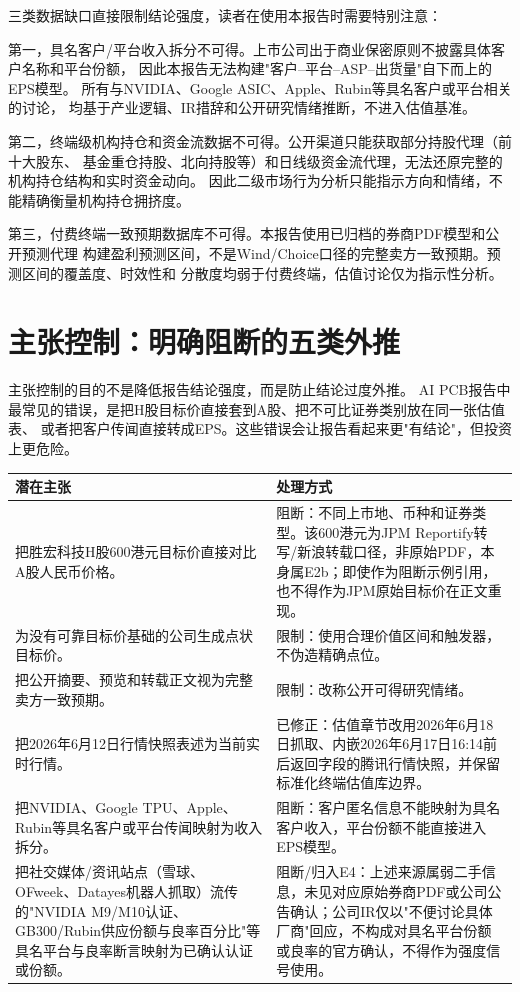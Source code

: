 三类数据缺口直接限制结论强度，读者在使用本报告时需要特别注意：

第一，具名客户/平台收入拆分不可得。上市公司出于商业保密原则不披露具体客户名称和平台份额，
因此本报告无法构建"客户--平台--ASP--出货量"自下而上的EPS模型。
所有与NVIDIA、Google ASIC、Apple、Rubin等具名客户或平台相关的讨论，
均基于产业逻辑、IR措辞和公开研究情绪推断，不进入估值基准。

第二，终端级机构持仓和资金流数据不可得。公开渠道只能获取部分持股代理（前十大股东、
基金重仓持股、北向持股等）和日线级资金流代理，无法还原完整的机构持仓结构和实时资金动向。
因此二级市场行为分析只能指示方向和情绪，不能精确衡量机构持仓拥挤度。

第三，付费终端一致预期数据库不可得。本报告使用已归档的券商PDF模型和公开预测代理
构建盈利预测区间，不是Wind/Choice口径的完整卖方一致预期。预测区间的覆盖度、时效性和
分散度均弱于付费终端，估值讨论仅为指示性分析。

\section{主张控制：明确阻断的五类外推}

主张控制的目的不是降低报告结论强度，而是防止结论过度外推。
AI PCB报告中最常见的错误，是把H股目标价直接套到A股、把不可比证券类别放在同一张估值表、
或者把客户传闻直接转成EPS。这些错误会让报告看起来更"有结论"，但投资上更危险。

\begin{exhibitbox}[图表2-3：明确阻断或限制的主张]
\small
\begin{tabularx}{\textwidth}{X L{4cm}}
\toprule
\textbf{潜在主张} & \textbf{处理方式} \\
\midrule
把胜宏科技H股600港元目标价直接对比A股人民币价格。 & 阻断：不同上市地、币种和证券类型。该600港元为JPM Reportify转写/新浪转载口径，非原始PDF，本身属E2b；即使作为阻断示例引用，也不得作为JPM原始目标价在正文重现。 \\
为没有可靠目标价基础的公司生成点状目标价。 & 限制：使用合理价值区间和触发器，不伪造精确点位。 \\
把公开摘要、预览和转载正文视为完整卖方一致预期。 & 限制：改称公开可得研究情绪。 \\
把2026年6月12日行情快照表述为当前实时行情。 & 已修正：估值章节改用2026年6月18日抓取、内嵌2026年6月17日16:14前后返回字段的腾讯行情快照，并保留标准化终端估值库边界。 \\
把NVIDIA、Google TPU、Apple、Rubin等具名客户或平台传闻映射为收入拆分。 & 阻断：客户匿名信息不能映射为具名客户收入，平台份额不能直接进入EPS模型。 \\
把社交媒体/资讯站点（雪球、OFweek、Datayes机器人抓取）流传的"NVIDIA M9/M10认证、GB300/Rubin供应份额与良率百分比"等具名平台与良率断言映射为已确认认证或份额。 & 阻断/归入E4：上述来源属弱二手信息，未见对应原始券商PDF或公司公告确认；公司IR仅以"不便讨论具体厂商"回应，不构成对具名平台份额或良率的官方确认，不得作为强度信号使用。 \\
\bottomrule
\end{tabularx}
\end{exhibitbox}

